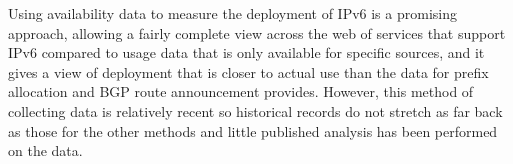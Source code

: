 Using availability data to measure the deployment of IPv6 is a promising
approach, allowing a fairly complete view across the web of services that
support IPv6 compared to usage data that is only available for specific sources,
and it gives a view of deployment that is closer to actual use than the data for
prefix allocation and BGP route announcement provides. However, this method of
collecting data is relatively recent so historical records do not stretch as far
back as those for the other methods and little published
analysis has been performed on the data.




